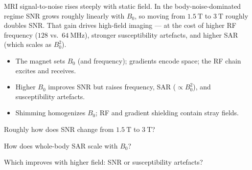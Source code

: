 \begin{workedexample}
MRI signal-to-noise rises steeply with static field. In the
body-noise-dominated regime SNR grows roughly linearly with $B_0$, so moving from
$1.5\ \text{T}$ to $3\ \text{T}$ roughly doubles SNR. That gain drives high-field
imaging --- at the cost of higher RF frequency ($128$ vs.\ $64\ \text{MHz}$),
stronger susceptibility artefacts, and higher SAR (which scales as $B_0^2$).
\end{workedexample}

\begin{keytakeaways}
\begin{itemize}[leftmargin=1.4em,itemsep=2pt]
\item The magnet sets $B_0$ (and frequency); gradients encode space; the RF chain excites and receives.
\item Higher $B_0$ improves SNR but raises frequency, SAR ($\propto B_0^2$), and susceptibility artefacts.
\item Shimming homogenizes $B_0$; RF and gradient shielding contain stray fields.
\end{itemize}
\end{keytakeaways}

\begin{exercises}
\item Roughly how does SNR change from $1.5\ \text{T}$ to $3\ \text{T}$?
\item How does whole-body SAR scale with $B_0$?
\item Which improves with higher field: SNR or susceptibility artefacts?
\end{exercises}

